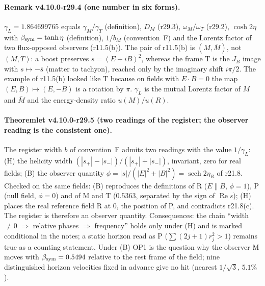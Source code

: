 \paragraph{Remark v4.10.0-r29.4 (one number in six forms).}
\(\gamma_L=1.864699765\) equals \(\gamma_M/\gamma_T\) (definition), \(D_M\) (r29.3), \(\omega_M/\omega_T\) (r29.2), \(\cosh2\eta\) with
\(\beta_{\rm sym}=\tanh\eta\) (definition), \(1/b_M\) (convention~F) and the Lorentz factor of two flux-opposed observers (r11.5(b)).  The pair of
r11.5(b) is \((M,\bar M)\), not \((M,T)\): a boost preserves \(s=(E+iB)^2\), whereas the frame T is the \(J_B\) image with \(s\mapsto-\bar s\) (matter to
tachyon), reached only by the imaginary shift \(i\pi/2\).  The example of r11.5(b) looked like T because on fields with \(E\cdot B=0\) the map
\((E,B)\mapsto(E,-B)\) is a rotation by \(\pi\).  \(\gamma_L\) is the mutual Lorentz factor of \(M\) and \(\bar M\) and the energy-density ratio
\(u(M)/u(R)\).

\paragraph{Theoremlet v4.10.0-r29.5 (two readings of the register; the observer reading is the consistent one).}
The register width \(b\) of convention~F admits two readings with the value \(1/\gamma_L\): (H) the helicity width
\((|s_+|-|s_-|)/(|s_+|+|s_-|)\), invariant, zero for real fields; (B) the observer quantity \(\phi=|s|/(|E|^2+|B|^2)=\operatorname{sech}2\eta_R\) of
r21.8.  Checked on the same fields: (B) reproduces the definitions of R (\(E\parallel B\), \(\phi=1\)), P (null field, \(\phi=0\)) and of M and T
(\(0.5363\), separated by the sign of \(\operatorname{Re}s\)); (H) places the real reference field R at \(0\), the position of P, and contradicts
r21.8(c).  The register is therefore an observer quantity.  Consequences: the chain ``width \(\ne0\) \(\Rightarrow\) relative phases \(\Rightarrow\)
frequency'' holds only under (H) and is marked conditional in the notes; a static horizon read as P (\(\sum(2j+1)r_j^2>1\)) remains true as a counting
statement.  Under (B) OP1 is the question why the observer M moves with \(\beta_{\rm sym}=0.5494\) relative to the rest frame of the field; nine
distinguished horizon velocities fixed in advance give no hit (nearest \(1/\sqrt3\), \(5.1\%\)).

